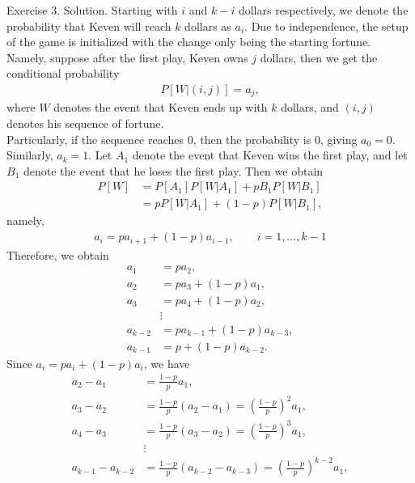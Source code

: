 \documentclass[hyperref={pdfpagelabels=false}]{beamer}
\newcommand{\structb}[1]{\textcolor[rgb]{0.2,0.2,0.7}{#1}}
\begin{document}
\begin{frame}[allowframebreaks]{Exercise 3.}
    \justifying
    \structb{Solution.} Starting with $i$ and $k-i$ dollars respectively, we denote the probability that Keven will reach $k$ dollars as $a_i$. Due to independence, the setup of the game is initialized with the change only being the starting fortune. Namely, suppose after the first play, Keven owns $j$ dollars, then we get the conditional probability
    \begin{align*}
        P[W|(i, j)] = a_j,
    \end{align*}
    where $W$ denotes the event that Keven ends up with $k$ dollars, and $(i, j)$ denotes his sequence of fortune. 
    ~\\
    Particularly, if the sequence reaches 0, then the probability is 0, giving $a_0 = 0$. Similarly, $a_k = 1$. Let $A_1$ denote the event that Keven wins the first play, and let $B_1$ denote the event that he loses the first play. Then we obtain
    \begin{align*}
        P[W] & = P[A_1]P[W|A_1] + p{B_1}P[W|B_1] \\
        & = pP[W|A_1] + (1 - p)P[W|B_1],
    \end{align*}
    namely,
    \begin{align*}
        a_i = pa_{i+1} + (1-p)a_{i-1}, \qquad i = 1, \ldots, k-1
    \end{align*}
    Therefore, we obtain
    \begin{align*}
        a_1 & = pa_2, \\
        a_2 & = pa_3 + (1-p)a_1, \\
        a_3 & = pa_4 + (1-p)a_2, \\
        & \vdots \\
        a_{k-2} & = pa_{k-1} + (1-p)a_{k-3}, \\
        a_{k-1} & = p + (1-p)a_{k-2}.
    \end{align*}
    Since $a_i = pa_i + (1-p)a_i$, we have
    \begin{align*}
        a_2 - a_1 & = \frac{1-p}{p}a_1, \\
        a_3 - a_2 & = \frac{1-p}{p}(a_2 - a_1) = \left(\frac{1-p}{p} \right)^2 a_1, \\
        a_4 - a_3 & = \frac{1-p}{p}(a_3 - a_2) = \left(\frac{1-p}{p} \right)^3 a_1, \\
        & \vdots \\
        a_{k-1} - a_{k-2} & = \frac{1-p}{p}(a_{k-2} - a_{k-3}) = \left(\frac{1-p}{p} \right)^{k-2} a_1, \\

\end{align*}
\end{frame}
\end{document}
